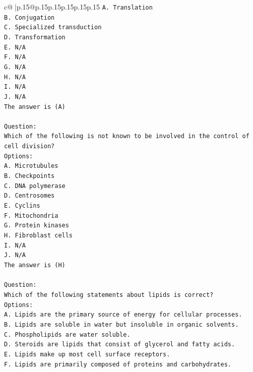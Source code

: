 \documentclass{article}
\begin{document}
{\begin{supertabular}{c@{$\;$}|p{.15\linewidth}@{}p{.15\linewidth}p{.15\linewidth}p{.15\linewidth}p{.15\linewidth}p{.15\linewidth}}
{{{\texttt{A. Translation} \\
\texttt{B. Conjugation} \\
\texttt{C. Specialized transduction} \\
\texttt{D. Transformation} \\
\texttt{E. N/A} \\
\texttt{F. N/A} \\
\texttt{G. N/A} \\
\texttt{H. N/A} \\
\texttt{I. N/A} \\
\texttt{J. N/A} \\
\texttt{The answer is (A)} \\
\\ 
\texttt{Question:} \\
\texttt{Which of the following is not known to be involved in the control of cell division?} \\
\texttt{Options:} \\
\texttt{A. Microtubules} \\
\texttt{B. Checkpoints} \\
\texttt{C. DNA polymerase} \\
\texttt{D. Centrosomes} \\
\texttt{E. Cyclins} \\
\texttt{F. Mitochondria} \\
\texttt{G. Protein kinases} \\
\texttt{H. Fibroblast cells} \\
\texttt{I. N/A} \\
\texttt{J. N/A} \\
\texttt{The answer is (H)} \\
\\ 
\texttt{Question:} \\
\texttt{Which of the following statements about lipids is correct?} \\
\texttt{Options:} \\
\texttt{A. Lipids are the primary source of energy for cellular processes.} \\
\texttt{B. Lipids are soluble in water but insoluble in organic solvents.} \\
\texttt{C. Phospholipids are water soluble.} \\
\texttt{D. Steroids are lipids that consist of glycerol and fatty acids.} \\
\texttt{E. Lipids make up most cell surface receptors.} \\
\texttt{F. Lipids are primarily composed of proteins and carbohydrates.} \\
}}}
\end{supertabular}}
\end{document}
